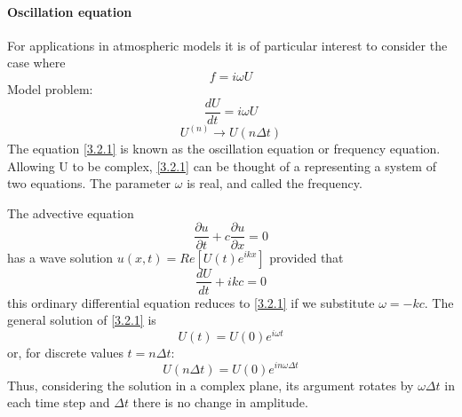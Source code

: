 \paragraph{Oscillation equation}
For applications in atmospheric models it is of particular interest to consider the case where $$f=i\omega U$$
Model problem:
\begin{equation}\label{3.2.1}
	\frac{dU}{dt}=i\omega U
\end{equation}
$$U^{(n)}\rightarrow U(n\Delta t)$$
The equation \ref{3.2.1} is known as the oscillation equation or frequency equation. Allowing U to be complex, \ref{3.2.1} can be thought of a representing a system of two equations. The parameter $\omega$ is real, and called the frequency.

The advective equation $$\frac{\partial u}{\partial t}+c\frac{\partial u}{\partial x}=0$$
has a wave solution $u(x,t)=Re[U(t)e^{ikx}]$ provided that
$$\frac{dU}{dt}+ikc=0$$
this ordinary differential equation reduces to \ref{3.2.1} if we substitute $\omega=-kc$.
The general solution of \ref{3.2.1} is
$$U(t)=U(0)e^{i\omega t}$$
or, for discrete values $t=n\Delta t$:
\begin{equation}
	U(n\Delta t)=U(0)e^{in\omega\Delta t}
\end{equation}
Thus, considering the solution in a complex plane, its argument rotates by $\omega\Delta t$ in each time step and $\Delta t$ there is no change in amplitude.

